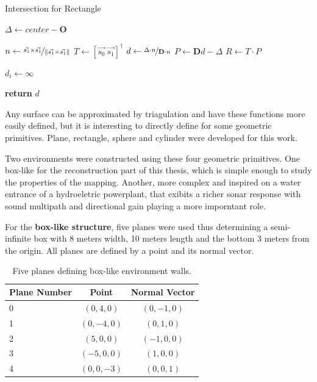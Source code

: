 \begin{algorithm}
\caption{Intersection for Rectangle}
\label{alg:rectangle}
\begin{algorithmic}

\State $\Delta \gets center -
\mathbf{O}$ 

\State $n \gets \nicefrac{\vec{s_1} \times  \vec{s_1}}{\left\lVert\vec{s_1} \times  \vec{s_1}\right\rVert}$
\State $T \gets \left[ \vec{s_0} ~ \vec{s_1} \right]^\dagger$
\State $d \gets \nicefrac{\Delta \cdot n}{\mathbf{D} \cdot n}$
\State $P \gets \mathbf{D}d - \Delta$
\State $R \gets T \cdot P$

\ForAll{$i \in \left[0,\ldots,\text{size}(d)\right)$}
\State $d_i \gets \infty$
\EndIf  
\EndFor


\State \textbf{return} $d$

\EndFunction
\end{algorithmic}
\end{algorithm}

Any surface can be approximated by triagulation and have these functions more
easily defined, but it is interesting to directly define for some geometric
primitives. Plane, rectangle, sphere and cylinder were developed for this work.

Two environments were constructed using these four geometric primitives. One
box-like for the reconstruction part of this thesis, which is simple enough to
study the properties of the mapping. Another, more complex and inspired on a
water entrance of a hydroeletric powerplant, that exibits a richer sonar
response with sound multipath and directional gain playing a more imporntant
role.

For the \textbf{box-like structure}, five planes were used thus determining a
semi-infinite box with 8 meters width, 10 meters length and the bottom 3 meters
from the origin. All planes are defined by a point and its normal vector.

\begin{table}[ht]
\centering
\begin{tabular}{lcc}
Plane Number & Point & Normal Vector \\
\hline
0 & $( 0, 4, 0)$ & $( 0,-1, 0)$  \\
1 & $( 0,-4, 0)$ & $( 0, 1, 0)$  \\
2 & $( 5, 0, 0)$ & $(-1, 0, 0)$  \\
3 & $(-5, 0, 0)$ & $( 1, 0, 0)$  \\
4 & $( 0, 0,-3)$ & $( 0, 0, 1)$  \\
\end{tabular}
\caption{Five planes defining box-like environment walls.}
\end{table}

